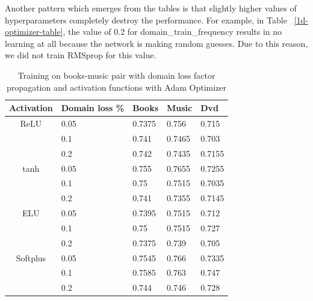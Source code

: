 \documentclass[11pt,a4paper]{article}
\begin{document}
Another pattern which emerges from the tables is that slightly higher values of hyperparameters completely destroy the performance. For example, in Table ~\ref{1d-optimizer-table}, the value of 0.2 for domain\_train\_frequency results in no learning at all because the network is making random guesses. Due to this reason, we did not train RMSprop for this value.

\begin{table}[h]
\begin{center}
\begin{tabular}{|c|l|l|l|l|}
\hline
Activation & \multicolumn{1}{|p{1cm}|}{Domain loss \%}& Books & Music & Dvd \\
\hline
ReLU & 0.05 & 0.7375 & 0.756 & 0.715  \\
 & 0.1 & 0.741 & 0.7465 & 0.703 \\
 & 0.2 & 0.742 & 0.7435 & 0.7155 \\
\hline
tanh & 0.05 & 0.755 & 0.7655 & 0.7255 \\
 & 0.1 & 0.75 & 0.7515 & 0.7035 \\
 & 0.2 & 0.741 & 0.7355 & 0.7145 \\
\hline
ELU & 0.05 & 0.7395 & 0.7515 & 0.712 \\
 & 0.1 & 0.75 & 0.7515 & 0.727 \\
 & 0.2 & 0.7375 & 0.739 & 0.705 \\
\hline
Softplus & 0.05 & 0.7545 & 0.766 & 0.7335 \\
 & 0.1 & 0.7585 & 0.763 & 0.747 \\
 & 0.2 & 0.744 & 0.746 & 0.728 \\
\hline
\end{tabular}
\end{center}
\caption{ Training on books-music pair with domain loss factor propagation and activation functions with Adam Optimizer}
\label{alpha-activation-table}
\end{table}
\end{document}
